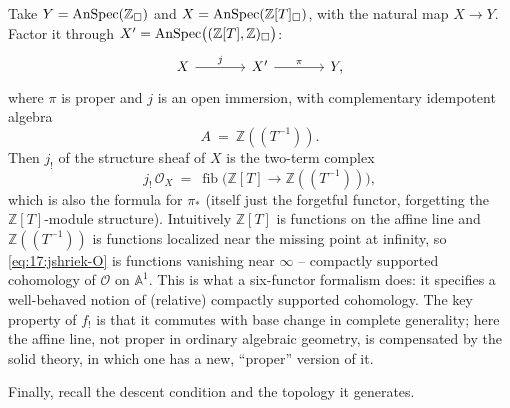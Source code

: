 \begin{example}
\label{ex:17:affine-line}
Take $Y=\operatorname{AnSpec}(\mathbb{Z}_{\square})$ and $X=\operatorname{AnSpec}(\mathbb{Z}[T]_{\square})$, with the
natural map $X\to Y$. Factor it through $X'=\operatorname{AnSpec}\bigl((\mathbb{Z}[T],\mathbb{Z})_{\square}\bigr)$:
\[
\begin{tikzcd}[column sep=large]
X \arrow[r, "j"] & X' \arrow[r, "\pi"] & Y,
\end{tikzcd}
\]
where $\pi$ is proper and $j$ is an open immersion, with complementary idempotent
algebra
\begin{equation*}
A\ =\ \mathbb{Z}(\!(T^{-1})\!).
\end{equation*}
Then $j_{!}$ of the structure sheaf of $X$ is the two-term complex
\begin{equation}
\label{eq:17:jshriek-O}
j_{!}\,\mathcal O_{X}\ =\ \operatorname{fib}\bigl(\mathbb{Z}[T]\to\mathbb{Z}(\!(T^{-1})\!)\bigr),
\end{equation}
which is also the formula for $\pi_{*}$ (itself just the forgetful functor, forgetting the
$\mathbb{Z}[T]$-module structure). Intuitively $\mathbb{Z}[T]$ is functions on the affine
line and $\mathbb{Z}(\!(T^{-1})\!)$ is functions localized near the missing point at
infinity, so \eqref{eq:17:jshriek-O} is functions vanishing near $\infty$ -- compactly
supported cohomology of $\mathcal O$ on $\mathbb{A}^{1}$. This is what a six-functor
formalism does: it specifies a well-behaved notion of (relative) compactly supported
cohomology. The key property of $f_{!}$ is that it commutes with base change in complete
generality; here the affine line, not proper in ordinary algebraic geometry, is
compensated by the solid theory, in which one has a new, ``proper'' version of it.
\end{example}

Finally, recall the descent condition and the topology it generates.

